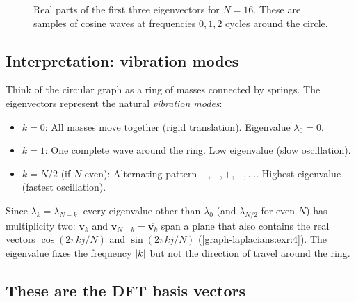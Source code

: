 \begin{notechapter}
\begin{figure}[H]

\caption{Real parts of the first three eigenvectors for $N=16$. These
         are samples of cosine waves at frequencies $0, 1, 2$ cycles
         around the circle.}
\label{dft-to-gnn:fig:cycle-eigvecs}
\end{figure}

\subsection{Interpretation: vibration modes}

Think of the circular graph as a ring of masses connected by springs.
The eigenvectors represent the natural \emph{vibration modes}:

\begin{itemize}
\item $k = 0$: All masses move together (rigid translation).
      Eigenvalue $\lambda_0 = 0$.
\item $k = 1$: One complete wave around the ring. Low eigenvalue
      (slow oscillation).
\item $k = N/2$ (if $N$ even): Alternating pattern $+,-,+,-,\ldots$.
      Highest eigenvalue (fastest oscillation).
\end{itemize}
Since $\lambda_k = \lambda_{N-k}$, every eigenvalue other than $\lambda_0$ (and $\lambda_{N/2}$ for even $N$) has multiplicity two: $\mathbf{v}_k$ and $\mathbf{v}_{N-k} = \overline{\mathbf{v}_k}$ span a plane that also contains the real vectors $\cos(2\pi kj/N)$ and $\sin(2\pi kj/N)$ (\cref{graph-laplacians:exr:4}). The eigenvalue fixes the frequency $\left|k\right|$ but not the direction of travel around the ring.

\subsection{These are the DFT basis vectors}


\end{notechapter}
